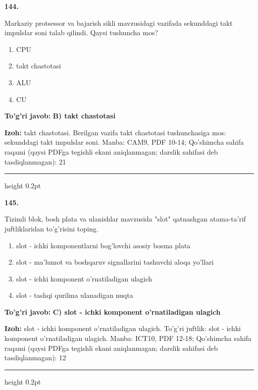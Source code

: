 \documentclass[10pt,a4paper]{article}
\begin{document}
{\bfseries\sffamily\color{ink} 144.}
\par
Markaziy protsessor va bajarish sikli mavzusidagi vazifada sekunddagi takt impulslar soni talab qilindi. Qaysi tushuncha mos?
\begin{enumerate}[label=\Alph*),leftmargin=9mm]
\item CPU
\item takt chastotasi
\item ALU
\item CU
\end{enumerate}
\begin{tcolorbox}[enhanced,breakable,colback=teal!4,colframe=teal!60!black,boxrule=0.45pt,arc=1.2mm,left=2.7mm,right=2.7mm,top=1.8mm,bottom=1.8mm,before skip=2mm,after skip=2mm]
{\bfseries\sffamily\color{teal}To'g'ri javob:} \textbf{B) takt chastotasi}
\par\smallskip
{\bfseries Izoh:} takt chastotasi. Berilgan vazifa takt chastotasi tushunchasiga mos: sekunddagi takt impulslar soni. Manba: CAM9, PDF 10-14; Qo'shimcha sahifa raqami (qaysi PDFga tegishli ekani aniqlanmagan; darslik sahifasi deb tasdiqlanmagan): 21
\end{tcolorbox}
\vspace{2mm}\hrule height 0.2pt\vspace{3mm}

{\bfseries\sffamily\color{ink} 145.}
\par
Tizimli blok, bosh plata va ulanishlar mavzusida "slot" qatnashgan atama-ta'rif juftliklaridan to'g'risini toping.
\begin{enumerate}[label=\Alph*),leftmargin=9mm]
\item slot - ichki komponentlarni bog'lovchi asosiy bosma plata
\item slot - ma'lumot va boshqaruv signallarini tashuvchi aloqa yo'llari
\item slot - ichki komponent o'rnatiladigan ulagich
\item slot - tashqi qurilma ulanadigan nuqta
\end{enumerate}
\begin{tcolorbox}[enhanced,breakable,colback=teal!4,colframe=teal!60!black,boxrule=0.45pt,arc=1.2mm,left=2.7mm,right=2.7mm,top=1.8mm,bottom=1.8mm,before skip=2mm,after skip=2mm]
{\bfseries\sffamily\color{teal}To'g'ri javob:} \textbf{C) slot - ichki komponent o'rnatiladigan ulagich}
\par\smallskip
{\bfseries Izoh:} slot - ichki komponent o'rnatiladigan ulagich. To'g'ri juftlik: slot - ichki komponent o'rnatiladigan ulagich. Manba: ICT10, PDF 12-18; Qo'shimcha sahifa raqami (qaysi PDFga tegishli ekani aniqlanmagan; darslik sahifasi deb tasdiqlanmagan): 12
\end{tcolorbox}
\vspace{2mm}\hrule height 0.2pt\vspace{3mm}
\end{document}
